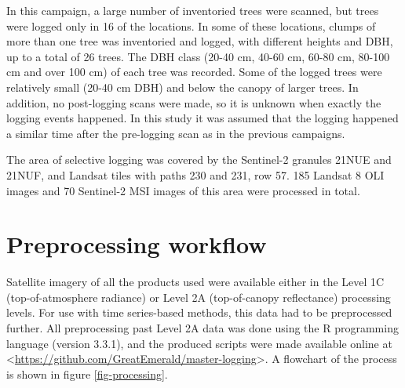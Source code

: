 \documentclass[a4paper,12pt]{scrbook}
\begin{document}
In this campaign, a large number of inventoried trees were scanned, but trees were logged only in 16 of the locations. In some of these locations, clumps of more than one tree was inventoried and logged, with different heights and \ac{DBH}, up to a total of 26 trees. The \ac{DBH} class (20-40 cm, 40-60 cm, 60-80 cm, 80-100 cm and over 100 cm) of each tree was recorded. Some of the logged trees were relatively small (20-40 cm \ac{DBH}) and below the canopy of larger trees. In addition, no post-logging scans were made, so it is unknown when exactly the logging events happened. In this study it was assumed that the logging happened a similar time after the pre-logging scan as in the previous campaigns.

The area of selective logging was covered by the Sentinel-2 granules 21NUE and 21NUF, and Landsat tiles with paths 230 and 231, row 57. 185 Landsat 8 \ac{OLI} images and 70 Sentinel-2 \ac{MSI} images of this area were processed in total.

\section{Preprocessing workflow}

Satellite imagery of all the products used were available either in the Level 1C (top-of-atmosphere radiance) or Level 2A (top-of-canopy reflectance) processing levels. For use with time series-based methods, this data had to be preprocessed further. All preprocessing past Level 2A data was done using the R programming language (version 3.3.1), and the produced scripts were made available online at <\url{https://github.com/GreatEmerald/master-logging}>. A flowchart of the process is shown in figure \ref{fig-processing}.
\end{document}
